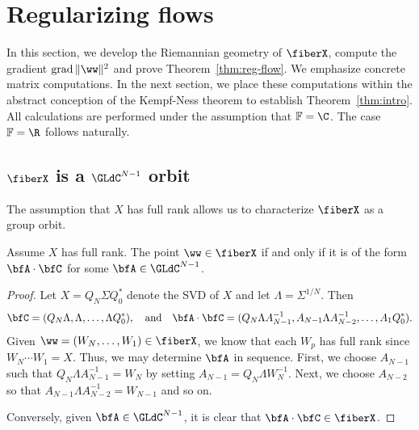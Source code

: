 \section{Regularizing flows}
\label{sec:reg-flow}

In this section, we develop the Riemannian geometry of $\fiberX$, compute the gradient $\grad \|\ww\|^2$ and prove Theorem~\ref{thm:reg-flow}. We emphasize concrete matrix computations. In the next section, we place these computations within the abstract conception of the Kempf-Ness theorem to establish Theorem~\ref{thm:intro}. All calculations are performed under the assumption that $\mathbb{F}=\C$. The case $\mathbb{F}=\R$ follows naturally. 




\subsection{$\fiberX$ is a $\GLdC^{N-1}$ orbit}
The assumption that $X$ has full rank allows us to characterize $\fiberX$ as a group orbit.
\begin{lemma}
\label{le:group-orbit}
Assume $X$ has full rank. The point $\ww \in \fiberX$ if and only if it is of the form $\bfA \cdot \bfC$ for some $\bfA\in \GLdC^{N-1}$.
\end{lemma}
\begin{proof}
Let $X=Q_N \Sigma Q_0^*$ denote the SVD of $X$ and let $\Lambda = \Sigma^{1/N}$. Then 
\begin{equation}
\nonumber
\bfC=(Q_N \Lambda, \Lambda, \ldots, \Lambda Q_0^*), \quad\mathrm{and}\quad \bfA\cdot \bfC = (Q_N \Lambda A_{N-1}^{-1}, A_{N-1} \Lambda A_{N-2}^{-1},\ldots, A_1 Q_0^*).   
\end{equation}
Given $\ww =(W_N,\ldots,W_1) \in \fiberX$, we know that each $W_p$ has full rank since $W_N \cdots W_1=X$. Thus, we may determine $\bfA$ in sequence. First, we choose $A_{N-1}$ such that $Q_N\Lambda A_{N-1}^{-1}= W_N$ by setting $A_{N-1}= Q_N\Lambda W_N^{-1}$. Next, we choose $A_{N-2}$ so that $A_{N-1} \Lambda A_{N-2}^{-1}=W_{N-1}$ and so on. 

Conversely, given $\bfA\in \GLdC^{N-1}$, it is clear that $\bfA\cdot \bfC \in \fiberX$.
\end{proof}

